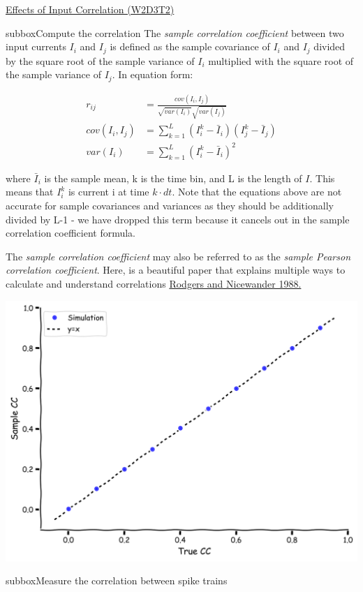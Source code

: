 \begin{textbox}{\href{https://compneuro.neuromatch.io/tutorials/W1D4_GeneralizedLinearModels/student/W1D4_Tutorial1.html}{Effects of Input Correlation (W2D3T2)} }
\begin{subbox}{subbox}{Compute the correlation}
\scriptsize
The \textit{sample correlation coefficient} between two input currents $I_i$ and $I_j$ is defined as the sample covariance of $I_i$ and $I_j$ divided by the square root of the sample variance of $I_i$ multiplied with the square root of the sample variance of $I_j$. In equation form:  

\begin{align}
r_{ij} &= \frac{cov(I_i, I_j)}{\sqrt{var(I_i)} \sqrt{var(I_j)}}\\
cov(I_i, I_j) &= \sum_{k=1}^L (I_i^k -\bar{I}_i)(I_j^k -\bar{I}_j) \\
var(I_i) &= \sum_{k=1}^L (I_i^k -\bar{I}_i)^2
\end{align}

where $\bar{I}_i$ is the sample mean, k is the time bin, and L is the length of $I$.  This means that $I_i^k$ is current i at time $k\cdot dt$. Note that the equations above are not accurate for sample covariances and variances as they should be additionally divided by L-1 - we have dropped this term because it cancels out in the sample correlation coefficient formula.

The \textit{sample correlation coefficient} may also be referred to as the \textit{sample Pearson correlation coefficient}. Here, is a beautiful paper that explains multiple ways to calculate and understand correlations \href{https://www.stat.berkeley.edu/~rabbee/correlation.pdf}{Rodgers and Nicewander 1988.}

\centering
\includegraphics[scale=0.1]{Figures/BNM/LIF_Figure5.png}
\end{subbox}
\begin{subbox}{subbox}{Measure the correlation between spike trains}
\scriptsize


\end{subbox}
\end{textbox}
